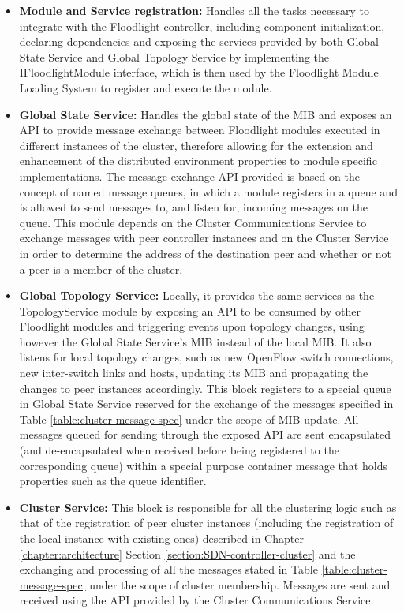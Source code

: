 \begin{itemize}
	\item \textbf{Module and Service registration:} Handles all the tasks necessary to integrate with the Floodlight controller, including component initialization, declaring dependencies and exposing the services provided by both Global State Service and Global Topology Service by implementing the IFloodlightModule interface, which is then used by the Floodlight Module Loading System to register and execute the module.
	\item \textbf{Global State Service:} Handles the global state of the \gls{MIB} and exposes an \gls{API} to provide message exchange between Floodlight modules executed in different instances of the cluster, therefore allowing for the extension and enhancement of the distributed environment properties to module specific implementations. The message exchange \gls{API} provided is based on the concept of named message queues, in which a module registers in a queue and is allowed to send messages to, and listen for, incoming messages on the queue. This module depends on the Cluster Communications Service to exchange messages with peer controller instances and on the Cluster Service in order to determine the address of the destination peer and whether or not a peer is a member of the cluster.
	\item \textbf{Global Topology Service:} Locally, it provides the same services as the TopologyService module by exposing an \gls{API} to be consumed by other Floodlight modules and triggering events upon topology changes, using however the Global State Service's \gls{MIB} instead of the local \gls{MIB}. It also listens for local topology changes, such as new OpenFlow switch connections, new inter-switch links and hosts, updating its \gls{MIB} and propagating the changes to peer instances accordingly. This block registers to a special queue in Global State Service reserved for the exchange of the messages specified in Table \ref{table:cluster-message-spec} under the scope of \gls{MIB} update. All messages queued for sending through the exposed \gls{API} are sent encapsulated (and de-encapsulated when received before being registered to the corresponding queue) within a special purpose container message that holds properties such as the queue identifier.
	\item \textbf{Cluster Service:} This block is responsible for all the clustering logic such as that of the registration of peer cluster instances (including the registration of the local instance with existing ones) described in Chapter \ref*{chapter:architecture} Section \ref{section:SDN-controller-cluster} and the exchanging and processing of all the messages stated in Table \ref{table:cluster-message-spec} under the scope of cluster membership. Messages are sent and received using the \gls{API} provided by the Cluster Communications Service.

\end{itemize}
